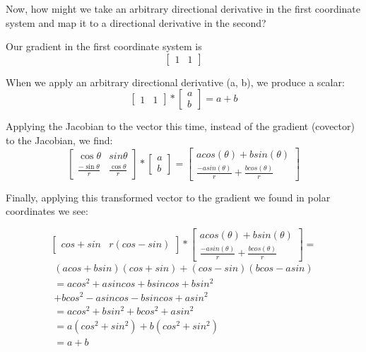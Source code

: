 \documentclass{article}
\newcommand{\showMatrixTwo}{\ensuremath{
\begin{bmatrix}
\cos\theta & sin\theta  \\
\frac{-\sin\theta}{r} &  \frac{\cos\theta}{r}
\end{bmatrix}
}}
\begin{document}
Now, how might we take an arbitrary directional derivative in the first coordinate system and map it to a directional derivative in the second?

Our gradient in the first coordinate system is 
\[\begin{bmatrix}
1 & 1
\end{bmatrix}
\]

When we apply an arbitrary directional derivative (a, b), we produce a scalar:
\begin{displaymath}
\begin{bmatrix}
1 & 1
\end{bmatrix}
*
\begin{bmatrix}
a \\
b
\end{bmatrix}
=
a + b
\end{displaymath}

Applying the Jacobian to the vector this time, instead of the gradient (covector) to the Jacobian, we find:
\begin{displaymath}
\showMatrixTwo
*
\begin{bmatrix}
a \\
b
\end{bmatrix}
=
\begin{bmatrix}
a cos(\theta) + b sin(\theta) \\
\frac{-a sin(\theta)}{r} +
\frac{b cos (\theta)}{r}
\end{bmatrix}
\end{displaymath}

Finally, applying this transformed vector to the gradient we found in polar coordinates we see:


\begin{displaymath}
\begin{bmatrix}
cos + sin & r(cos-sin)
\end{bmatrix}
*
\begin{bmatrix}
a cos(\theta) + b sin (\theta) \\
\frac{-a sin(\theta)}{r} +
\frac{b cos (\theta)}{r}
\end{bmatrix}
=
\end{displaymath}
\begin{displaymath}
\begin{aligned}
(acos + bsin)(cos + sin) + (cos- sin)(bcos -asin) \\
= acos^2 + asin cos + bsin cos + bsin^2 \\
+ bcos^2 - asin cos - bsin cos + a sin^2 \\
= acos^2 + b sin^2 + bcos^2 + a sin^2 \\
= a(cos^2 + sin^2) + b(cos^2 + sin^2) \\
= a + b
\end{aligned}
\end{displaymath}
\end{document}
